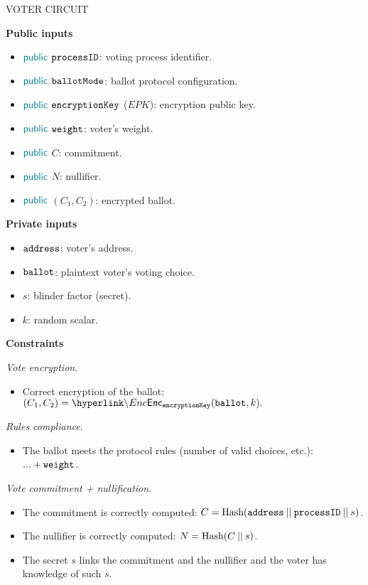 \begin{mdframed}
	\begin{minipage}[H]{1\textwidth}
		\begin{spacing}{1.25}
			\vspace{0.3cm}
			\begin{center}{VOTER CIRCUIT}\end{center}
			\textbf{Public inputs}
				\begin{itemize}
					\item ${\sf\color{teal}public}$ $\texttt{processID}$: voting process identifier. 
					\item ${\sf\color{teal}public}$ $\texttt{ballotMode}$: ballot protocol configuration.
					\item ${\sf\color{teal}public}$ $\texttt{encryptionKey}$ ($EPK$): encryption public key.
					\item ${\sf\color{teal}public}$ $\texttt{weight}$: voter's weight.
					\item ${\sf\color{teal}public}$ $C$: commitment.
					\item ${\sf\color{teal}public}$ $N$: nullifier.
					\item ${\sf\color{teal}public}$ $(C_1, C_2)$: encrypted ballot. 
				\end{itemize}
			\textbf{Private inputs}
				\begin{itemize}								
					\item \private $\texttt{address}$: voter's address.
					\item \private $\texttt{ballot}$: plaintext voter's voting choice.
					\item \private $s$: blinder factor (secret).
					\item \private $k$: random scalar.
				\end{itemize}
			\textbf{Constraints} \\ \vspace{-0.4cm}		
				
				\emph{Vote encryption}. 
				\begin{itemize}								
					\item Correct encryption of the ballot: $(C_1, C_2) = \hlget{\Enc}_{\epk}(\ballot, k).$
				\end{itemize}
				\emph{Rules compliance}. 
				\begin{itemize}								
					\item The ballot meets the protocol rules (number of valid choices, etc.): $... + \texttt{weight}$.
				\end{itemize}
				\emph{Vote commitment + nullification}. 
				\begin{itemize}								
					\item The commitment is correctly computed: $C = \text{Hash} (\texttt{address} \:||\: \texttt{processID} \:||\: s)$.
					\item The nullifier is correctly computed: $N = \text{Hash}(C \:||\: s)$.
					\item The secret $s$ links the commitment and the nullifier and the voter has knowledge of such $s$.
				\end{itemize}
				\vspace{-0.3cm}
		\end{spacing}
	\end{minipage}
\end{mdframed}

